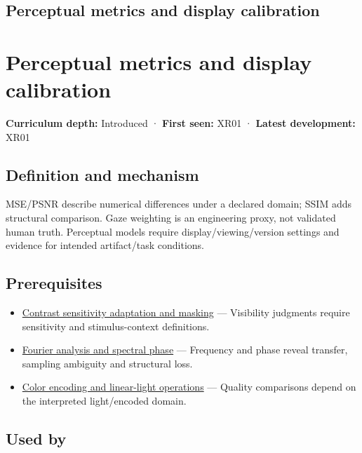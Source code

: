 \hypertarget{appendix-b2c1846508bf}{}
\section*{Perceptual metrics and display calibration}
\chapter{Perceptual metrics and display calibration}\label{appendix-b2c1846508bf-perceptual-metrics-and-display-calibration}

\textbf{Curriculum depth:} Introduced · \textbf{First seen:} XR01 · \textbf{Latest development:} XR01

\section{Definition and mechanism}\label{appendix-b2c1846508bf-definition-and-mechanism}

MSE/PSNR describe numerical differences under a declared domain; SSIM adds structural comparison. Gaze weighting is an engineering proxy, not validated human truth. Perceptual models require display/viewing/version settings and evidence for intended artifact/task conditions.

\section{Prerequisites}\label{appendix-b2c1846508bf-prerequisites}

\begin{itemize}
\tightlist
\item
  \hyperref[appendix-b3aa9e8e01ad]{Contrast sensitivity adaptation and masking} --- Visibility judgments require sensitivity and stimulus-context definitions.
\item
  \hyperref[appendix-b60686ba06a1]{Fourier analysis and spectral phase} --- Frequency and phase reveal transfer, sampling ambiguity and structural loss.
\item
  \hyperref[appendix-a9f83ad40792]{Color encoding and linear-light operations} --- Quality comparisons depend on the interpreted light/encoded domain.
\end{itemize}

\section{Used by}\label{appendix-b2c1846508bf-used-by}

